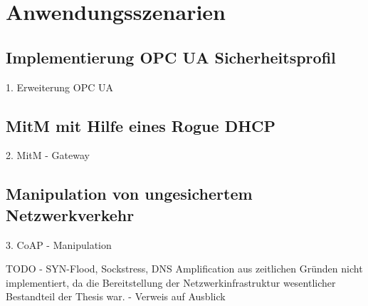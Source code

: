 \chapter{Anwendungsszenarien}
\label{Anwendungsszenarien}

\section{Implementierung OPC UA Sicherheitsprofil}
1. Erweiterung OPC UA

\section{MitM mit Hilfe eines Rogue DHCP}
2. MitM - Gateway

\section{Manipulation von ungesichertem Netzwerkverkehr}
3. CoAP - Manipulation

TODO - SYN-Flood, Sockstress, DNS Amplification aus zeitlichen Gründen nicht implementiert, da die Bereitstellung der Netzwerkinfrastruktur wesentlicher Bestandteil der Thesis war. - Verweis auf Ausblick
